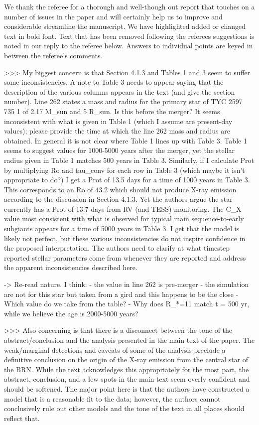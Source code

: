 We thank the referee for a thorough and well-though out report that touches on a number of issues in the paper and will certainly help us to improve and considerable streamline the manuscript. We have highlighted added or changed text in bold font. Text that has been removed following the referees suggestions is noted in our reply to the referee below. Answers to individual points are keyed in between the referee's comments.



>>> My biggest concern is that Section 4.1.3 and Tables 1 and 3 seem to suffer some inconsistencies. A note to Table 3 needs to appear saying that the description of the various columns appears in the text (and give the section number). Line 262 states a mass and radius for the primary star of TYC 2597 735 1 of 2.17 M_sun and 5 R_sun. Is this before the merger? It seems inconsistent with what is given in Table 1 (which I assume are present-day values); please provide the time at which the line 262 mass and radius are obtained. In general it is not clear where Table 1 lines up with Table 3. Table 1 seems to suggest values for 1000-5000 years after the merger, yet the stellar radius given in Table 1 matches 500 years in Table 3. Similarly, if I calculate Prot by multiplying Ro and tau_conv for each row in Table 3 (which maybe it isn't appropriate to do?) I get a Prot of 13.5 days for a time of 1000 years in Table 3. This corresponds to an Ro of 43.2 which should not produce X-ray emission according to the discussion in Section 4.1.3. Yet the authors argue the star currently has a Prot of 13.7 days from RV (and TESS) monitoring. The C_X value most consistent with what is observed for typical main sequence-to-early subgiants appears for a time of 5000 years in Table 3. I get that the model is likely not perfect, but these various inconsistencies do not inspire confidence in the proposed interpretation. The authors need to clarify at what timestep reported stellar parameters come from whenever they are reported and address the apparent inconsistencies described here.


-> Re-read nature. I think:
- the value in line 262 is pre-merger
- the simulation are not for this star but taken from a gird and this happens to be the close
- Which value do we take from the table?
- Why does R_*=11 match t = 500 yr, while we believe the age is 2000-5000 years?

>>> Also concerning is that there is a disconnect between the tone of the abstract/conclusion and the analysis presented in the main text of the paper. The weak/marginal detections and caveats of some of the analysis preclude a definitive conclusion on the origin of the X-ray emission from the central star of the BRN. While the text acknowledges this appropriately for the most part, the abstract, conclusion, and a few spots in the main text seem overly confident and should be softened. The major point here is that the authors have constructed a model that is a reasonable fit to the data; however, the authors cannot conclusively rule out other models and the tone of the text in all places should reflect that. 

